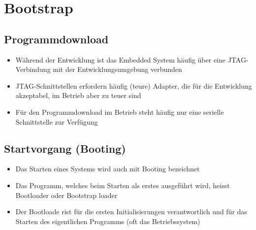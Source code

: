 \section{Bootstrap}
\subsection{Programmdownload}
\begin{itemize}
	\item Während der Entwicklung ist das Embedded System häufig über eine JTAG-Verbindung mit der      Entwicklungsumgebung verbunden 
	\item JTAG-Schnittstellen erfordern häufig (teure) Adapter, die für die Entwicklung akzeptabel,       im Betrieb aber zu teuer sind
	\item Für den Programmdownload im Betrieb steht häufig nur eine serielle Schnittstelle zur Verfügung
\end{itemize}

\subsection{Startvorgang (Booting)}
\begin{itemize}
	\item Das Starten eines Systems wird auch mit Booting bezeichnet
	\item Das Programm, welches beim Starten als erstes ausgeführt wird, heisst Bootloader oder Bootstrap loader 
	\item Der Bootloade rist für die ersten Initialisierungen verantwortlich und für das Starten des eigentlichen Programms (oft das Betriebssystem) 
\end{itemize}

